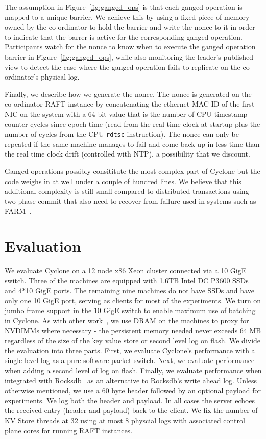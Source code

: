 \documentclass[pageno]{jpaper}
\begin{document}
The assumption in Figure~\ref{fig:ganged_ops} is that each ganged operation is
mapped to a unique barrier. We achieve this by using a fixed piece of memory
owned by the co-ordinator to hold the barrier and write the nonce to it in order
to indicate that the barrer is active for the corresponding ganged
operation. Participants watch for the nonce to know when to execute the
ganged operation barrier in Figure~\ref{fig:ganged_ops}, while also monitoring
the leader's published view to detect the case where the ganged operation fails
to replicate on the co-ordinator's physical log.

Finally, we describe how we generate the nonce. The nonce is generated on the
co-ordinator RAFT instance by concatenating the ethernet MAC ID of the first NIC
on the system with a 64 bit value that is the number of CPU timestamp counter
cycles since epoch time (read from the real time clock at startup plus the
number of cycles from the CPU {\tt rdtsc} instruction). The nonce can only be
repeated if the same machine manages to fail and come back up in less time than
the real time clock drift (controlled with NTP), a possibility that we discount.

Ganged operations possibly consititute the most complex part of Cyclone but the
code weighs in at well under a couple of hundred lines. We believe that
this additional complexity is still small compared to distributed transactions
using two-phase commit that also need to recover from failure used in systems
such as FARM~\cite{farm}.

\section{Evaluation}
\label{sec:evaluation}
We evaluate Cyclone on a 12 node x86 Xeon cluster connected via a 10 GigE
switch. Three of the machines are equipped with 1.6TB Intel DC P3600 SSDs and
4*10 GigE ports. The remaining nine machines do not have SSDs and have only one
10 GigE port, serving as clients for most of the experiments. We turn on jumbo
frame support in the 10 GigE switch to enable maximum use of batching in
Cyclone. As with other work~\cite{faast}, we use DRAM on the machines to proxy
for NVDIMMs where necessary - the persistent memory needed never exceeds 64 MB
regardless of the size of the key value store or second level log on flash. We
divide the evaluation into three parts. First, we evaluate Cyclone's performance
with a single level log as a pure software packet switch. Next, we evaluate
performance when adding a second level of log on flash. Finally, we evaluate
performance when integrated with Rocksdb~\cite{rocksdb} as an alternative to
Rocksdb's write ahead log. Unless otherwise mentioned, we use a 60 byte header
followed by an optional payload for experiments. We log both the header and
payload. In all cases the server echoes the received entry (header and payload)
back to the client. We fix the number of KV Store threads at 32 using at most 8
physcial logs with associated control plane cores for running RAFT instances.
\end{document}
